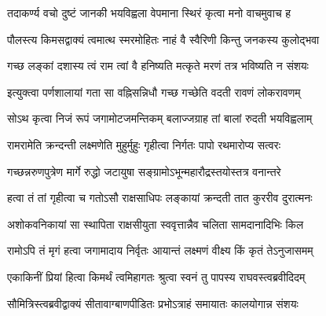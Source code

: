 
\translink{}

\storymeta



\twolineshloka
{तदाकर्ण्य वचो दुष्टं जानकी भयविह्वला}
{वेपमाना स्थिरं कृत्वा मनो वाचमुवाच ह}%

\twolineshloka
{पौलस्त्य किमसद्वाक्यं त्वमात्थ स्मरमोहितः}
{नाहं वै स्वैरिणी किन्तु जनकस्य कुलोद्‌भवा}%

\twolineshloka
{गच्छ लङ्कां दशास्य त्वं राम त्वां वै हनिष्यति}
{मत्कृते मरणं तत्र भविष्यति न संशयः}%

\twolineshloka
{इत्युक्त्वा पर्णशालायां गता सा वह्निसन्निधौ}
{गच्छ गच्छेति वदती रावणं लोकरावणम्}%

\twolineshloka
{सोऽथ कृत्वा निजं रूपं जगामोटजमन्तिकम्}
{बलाज्जग्राह तां बालां रुदती भयविह्वलाम्}%

\twolineshloka
{रामरामेति क्रन्दन्ती लक्ष्मणेति मुहुर्मुहुः}
{गृहीत्वा निर्गतः पापो रथमारोप्य सत्वरः}%

\twolineshloka
{गच्छन्नरुणपुत्रेण मार्गे रुद्धो जटायुषा}
{सङ्ग्रामोऽभून्महारौद्रस्तयोस्तत्र वनान्तरे}%

\twolineshloka
{हत्वा तं तां गृहीत्वा च गतोऽसौ राक्षसाधिपः}
{लङ्कायां क्रन्दती तात कुररीव दुरात्मनः}%

\twolineshloka
{अशोकवनिकायां सा स्थापिता राक्षसीयुता}
{स्ववृत्तान्नैव चलिता सामदानादिभिः किल}%

\twolineshloka
{रामोऽपि तं मृगं हत्वा जगामादाय निर्वृतः}
{आयान्तं लक्ष्मणं वीक्ष्य किं कृतं तेऽनुजासमम्}%

\twolineshloka
{एकाकिनीं प्रियां हित्वा किमर्थं त्वमिहागतः}
{श्रुत्वा स्वनं तु पापस्य राघवस्त्वब्रवीदिदम्}%

\twolineshloka
{सौ‌मित्रिस्त्वब्रवीद्वाक्यं सीतावाग्बाणपीडितः}
{प्रभोऽत्राहं समायातः कालयोगान्न संशयः}%

